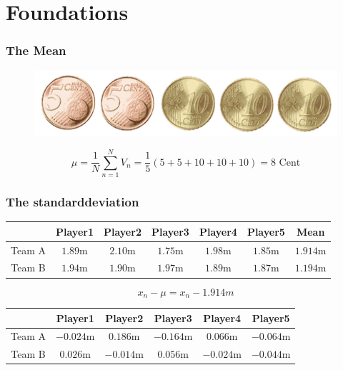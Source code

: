 \documentclass{beamer}
\begin{document}
\section{Foundations}

\begin{frame}
    \frametitle{The Mean}
    \begin{figure}
        \centering
        \includegraphics[width=1\textwidth]{images/graphics/coins.png}
    \end{figure}
    \vspace{1cm}
    \begin{equation*}
        \mu = \frac{1}{N} \sum _{n=1}^{N}V_{n}= \frac{1}{5} \left( 5+5+10+10+10 \right) = 8 \text{ Cent}
    \end{equation*}
\end{frame}

\begin{frame}
    \frametitle{The standarddeviation}


    \footnotesize
    \begin{tabular}{ c|ccccc|c }
        \hline
             & Player1 & Player2 & Player3 & Player4 & Player5 & Mean \\ 
        \hline
            Team A & \(1.89\)m & \(2.10\)m & \(1.75\)m & \(1.98\)m & \(1.85\)m & \(1.914\)m \\ 
            Team B & \(1.94\)m & \(1.90\)m & \(1.97\)m & \(1.89\)m & \(1.87\)m & \(1.194\)m \\ 
        \hline
    \end{tabular}

    \vspace{0.5cm}

    \normalsize
    \begin{equation*}
        x_{n} -  \mu = x_{n}-1.914m
    \end{equation*}

    \vspace{0.5cm}

    \footnotesize
    \begin{tabular}{ c|ccccc }
        \hline
             & Player1 & Player2 & Player3 & Player4 & Player5 \\ 
        \hline
            Team A & \(-0.024\)m & \(0.186\)m & \(-0.164\)m & \(0.066\)m & \(-0.064\)m \\ 
            Team B & \(0.026\)m & \(-0.014\)m & \(0.056\)m & \(-0.024\)m & \(-0.044\)m \\ 
        \hline
    \end{tabular}


\end{frame}
\end{document}
